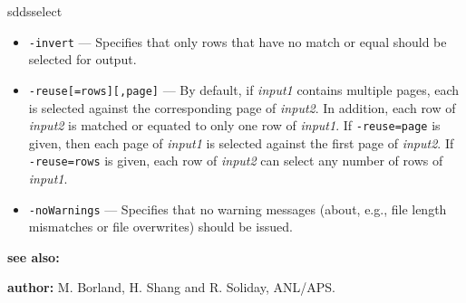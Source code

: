 \begin{sddsprog}{sddsselect}
\begin{itemize}
      \item \verb|-invert| --- Specifies that only rows that have no match or equal should be selected for output.
      \item \verb|-reuse[=rows][,page]| --- By default, if \emph{input1} contains multiple pages, each is selected against the corresponding page of \emph{input2}. In addition, each row of \emph{input2} is matched or equated to only one row of \emph{input1}. If \verb|-reuse=page| is given, then each page of \emph{input1} is selected against the first page of \emph{input2}. If \verb|-reuse=rows| is given, each row of \emph{input2} can select any number of rows of \emph{input1}.
      \item \verb|-noWarnings| --- Specifies that no warning messages (about, e.g., file length mismatches or file overwrites) should be issued.
    \end{itemize}
  \item \textbf{see also:}  
  \item \textbf{author:} M. Borland, H. Shang and R. Soliday, ANL/APS.
\end{sddsprog}


